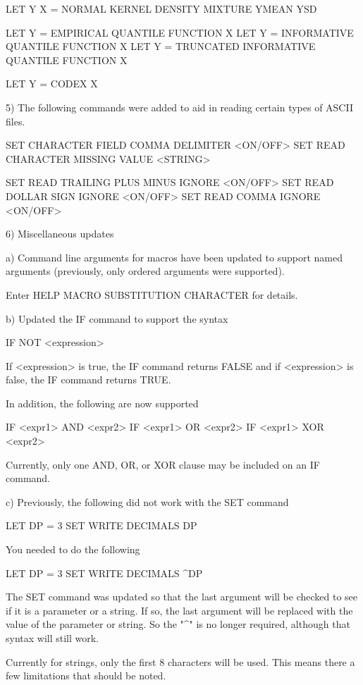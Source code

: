        LET Y X = NORMAL KERNEL DENSITY MIXTURE YMEAN YSD

       LET Y = EMPIRICAL QUANTILE FUNCTION X
       LET Y = INFORMATIVE QUANTILE FUNCTION X
       LET Y = TRUNCATED INFORMATIVE QUANTILE FUNCTION X

       LET Y = CODEX X

 5) The following commands were added to aid in reading certain
    types of ASCII files.

        SET CHARACTER FIELD COMMA DELIMITER <ON/OFF>
        SET READ CHARACTER MISSING VALUE <STRING>

        SET READ TRAILING PLUS MINUS IGNORE <ON/OFF>
        SET READ DOLLAR SIGN IGNORE <ON/OFF>
        SET READ COMMA IGNORE <ON/OFF>

 6) Miscellaneous updates

    a) Command line arguments for macros have been updated to support
       named arguments (previously, only ordered arguments were
       supported).

          Enter HELP MACRO SUBSTITUTION CHARACTER for details.

    b) Updated the IF command to support the syntax

          IF NOT <expression>

       If <expression> is true, the IF command returns FALSE and
       if <expression> is false, the IF command returns TRUE.

       In addition, the following are now supported

          IF <expr1>  AND  <expr2>
          IF <expr1>  OR   <expr2>
          IF <expr1>  XOR  <expr2>

       Currently, only one AND, OR, or XOR clause may be included on
       an IF command.

    c) Previously, the following did not work with the SET command

          LET DP = 3
          SET WRITE DECIMALS DP

       You needed to do the following

          LET DP = 3
          SET WRITE DECIMALS ^DP

       The SET command was updated so that the last argument will
       be checked to see if it is a parameter or a string.  If so,
       the last argument will be replaced with the value of the
       parameter or string.  So the "^" is no longer required,
       although that syntax will still work.

       Currently for strings, only the first 8 characters will be
       used.  This means there a few limitations that should be noted.


